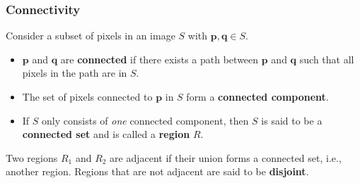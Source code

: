 \documentclass{article}
\begin{document}
\subsubsection{Connectivity}
Consider a subset of pixels in an image \(S\) with \(\symbf{p},
\symbf{q} \in S\).
\begin{itemize}
    \item \(\symbf{p}\) and \(\symbf{q}\) are \textbf{connected} if
          there exists a path between \(\symbf{p}\) and \(\symbf{q}\) such
          that all pixels in the path are in \(S\).
    \item The set of pixels connected to \(\symbf{p}\) in \(S\) form a
          \textbf{connected component}.
    \item If \(S\) only consists of \textit{one} connected component,
          then \(S\) is said to be a \textbf{connected set} and is
          called a \textbf{region} \(R\).
\end{itemize}
Two regions \(R_1\) and \(R_2\) are adjacent if their union forms a
connected set, i.e., another region. Regions that are not adjacent are
said to be \textbf{disjoint}.
\end{document}
